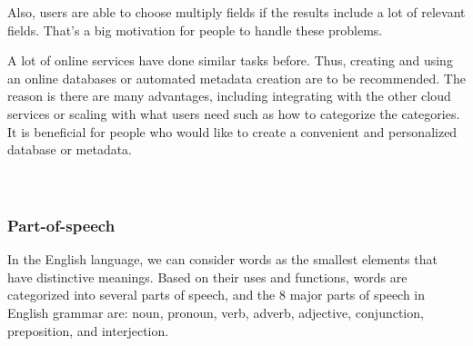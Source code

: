 Also, users are able to choose multiply fields if the results include a lot of relevant fields. 
That's a big motivation for people to handle these problems. 

A lot of online services have done similar tasks before. 
Thus, creating and using an online databases or automated metadata creation are to be recommended. 
The reason is there are many advantages, including integrating with the other cloud services or scaling with what users need such as how to categorize the categories. 
It is beneficial for people who would like to create a convenient and personalized database or metadata.\\\\\\


\subsubsection*{Part-of-speech}

In the English language, we can consider words as the smallest elements that have distinctive meanings. 
Based on their uses and functions, words are categorized into several parts of speech, and the 8 major parts of speech in English grammar are: noun, pronoun, verb, adverb, adjective, conjunction, preposition, and interjection.

